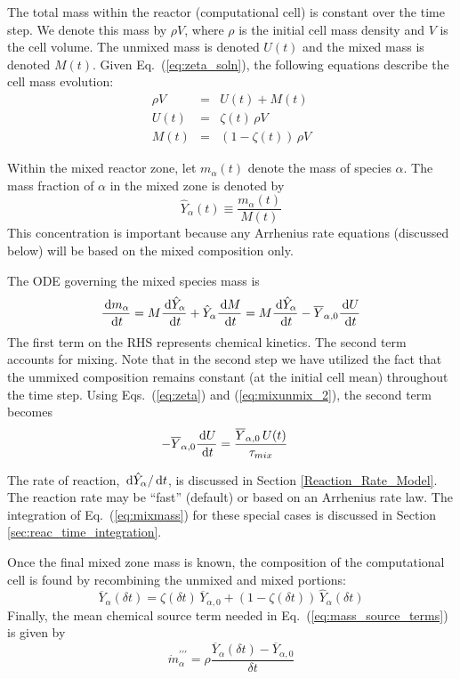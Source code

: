 The total mass within the reactor (computational cell) is constant over the time step.  We denote this mass by $\rho V$, where $\rho$ is the initial cell mass density and $V$ is the cell volume.  The unmixed mass is denoted $U(t)$ and the mixed mass is denoted $M(t)$.  Given Eq.~(\ref{eq:zeta_soln}), the following equations describe the cell mass evolution:
\begin{eqnarray}
\label{eq:mixunmix_1} \rho V &=& U(t) + M(t) \\
\label{eq:mixunmix_2} U(t) &=& \zeta(t)\,\rho V \\
\label{eq:mixunmix_3} M(t) &=& (1-\zeta(t))\,\rho V
\end{eqnarray} 

Within the mixed reactor zone, let $m_\alpha(t)$ denote the mass of species $\alpha$.  The mass fraction of $\alpha$ in the mixed zone is denoted by
\begin{equation}\label{eq:mass_fraction_mixed}
\hat{Y}_{\alpha}(t)\equiv\frac{m_{\alpha}(t)}{M(t)}
\end{equation}
This concentration is important because any Arrhenius rate equations (discussed below) will be based on the mixed composition only.

The ODE governing the mixed species mass is
\begin{equation}\label{eq:mixmass}
\frac{\,\mathrm{d} m_{\alpha}}{\,\mathrm{d} t} = M \frac{\,\mathrm{d} \hat{Y}_\alpha}{\,\mathrm{d} t} + \hat{Y}_\alpha \frac{\,\mathrm{d} M}{\,\mathrm{d} t} = M \frac{\,\mathrm{d} \hat{Y}_\alpha}{\,\mathrm{d} t} - \overline{Y}_{\alpha,0} \frac{\,\mathrm{d} U}{\,\mathrm{d} t}
\end{equation}
The first term on the RHS represents chemical kinetics.  The second term accounts for mixing.  Note that in the second step we have utilized the fact that the ummixed composition remains constant (at the initial cell mean) throughout the time step. Using Eqs.~(\ref{eq:zeta}) and (\ref{eq:mixunmix_2}), the second term becomes
\begin{align}
-\overline{Y}_{\alpha,0} \frac{\,\mathrm{d} U}{\,\mathrm{d} t} &= \frac{\overline{Y}_{\alpha,0} \, U(t) }{\tau_{mix}}
\end{align}

The rate of reaction, $\,\mathrm{d} \hat{Y}_\alpha/\,\mathrm{d} t$, is discussed in Section \ref{Reaction_Rate_Model}. The reaction rate may be ``fast'' (default) or based on an Arrhenius rate law.  The integration of Eq.~(\ref{eq:mixmass}) for these special cases is discussed in Section \ref{sec:reac_time_integration}.

Once the final mixed zone mass is known, the composition of the computational cell is found by recombining the unmixed and mixed portions:
\begin{equation}\label{eq:final_comp}
\overline{Y}_{\alpha}(\delta t)= \zeta(\delta t) \, \overline{Y}_{\alpha,0} + (1-\zeta(\delta t)) \, \hat{Y}_{\alpha}(\delta t)
\end{equation}
Finally, the mean chemical source term needed in Eq.~(\ref{eq:mass_source_terms}) is given by
\begin{equation}\label{mass_prod_rate}
\dot{m}^{\prime\prime\prime}_{\alpha} = \rho \frac{\overline{Y}_{\alpha}(\delta t) - \overline{Y}_{\alpha,0}}{\delta t}
\end{equation}


